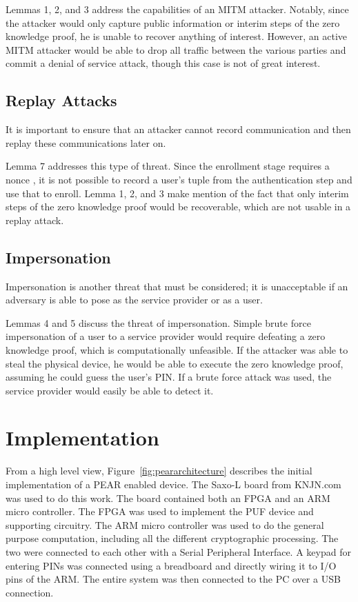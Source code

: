 Lemmas 1, 2, and 3 address the capabilities of an MITM attacker. Notably, since the attacker would only capture
public information or interim steps of the zero knowledge proof, he is unable to recover anything of interest.
However, an active MITM attacker would be able to drop all traffic between the various parties and commit a
denial of service attack, though this case is not of great interest.

\subsection{Replay Attacks}
It is important to ensure that an attacker cannot record communication and then replay these communications
later on.

Lemma 7 addresses this type of threat. Since the enrollment stage requires a nonce , it is not possible
to record a user's tuple from the authentication step and use that to enroll. Lemma 1, 2, and 3 make mention
of the fact that only interim steps of the zero knowledge proof would be recoverable, which are not usable
in a replay attack.

\subsection{Impersonation}
Impersonation is another threat that must be considered; it is unacceptable if an adversary is able to pose as
the service provider or as a user.

Lemmas 4 and 5 discuss the threat of impersonation. Simple brute force impersonation of a user to a service
provider would require defeating a zero knowledge proof, which is computationally unfeasible. If the attacker
was able to steal the physical device, he would be able to execute the zero knowledge proof, assuming he could
guess the user's PIN. If a brute force attack was used, the service provider would easily be able to detect it.

\section{Implementation}
From a high level view, Figure~\ref{fig:peararchitecture} describes the initial implementation of a PEAR enabled device.
The Saxo-L board from KNJN.com~\cite{KNJN} was used to do this work. The board contained both an FPGA and an ARM
micro controller. The FPGA was used to implement the PUF device and supporting circuitry. The ARM micro controller
was used to do the general purpose computation, including all the different cryptographic processing. The two
were connected to each other with a Serial Peripheral Interface. A keypad for entering PINs was connected using a
breadboard and directly wiring it to I/O pins of the ARM. The entire system was then connected to the PC over
a USB connection.

